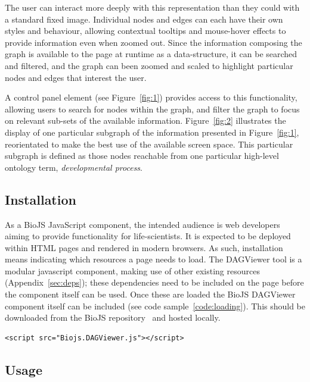 \documentclass[10pt,a4paper,twocolumn]{article}
\begin{document}
The user can interact more deeply with this representation than they could with
a standard fixed image. Individual nodes and edges can each have their own
styles and behaviour, allowing contextual tooltips and mouse-hover effects to
provide information even when zoomed out. Since the information composing the
graph is available to the page at runtime as a data-structure, it can be
searched and filtered, and the graph can been zoomed and scaled to highlight
particular nodes and edges that interest the user.

A control panel element (see Figure~\ref{fig:1}) provides access to this
functionality, allowing users to search for nodes within the graph, and filter
the graph to focus on relevant sub-sets of the available information.
Figure~\ref{fig:2} illustrates the display of one particular subgraph of the
information presented in Figure~\ref{fig:1}, reorientated to make the best use
of the available screen space. This particular subgraph is defined as those
nodes reachable from one particular high-level ontology term,
\emph{developmental process}.

\subsection*{Installation}

As a BioJS JavaScript component, the intended audience is web developers aiming
to provide functionality for life-scientists. It is expected to be deployed
within HTML pages and rendered in modern browsers. As such,
installation means indicating which resources a page needs to load.  The
DAGViewer tool is a modular javascript component, making use of other existing
resources (Appendix~\ref{sec:deps}); these dependencies need to be
included on the page before the component itself can be used.  Once these are
loaded the BioJS DAGViewer component itself can be included (see code
sample~\ref{code:loading}).  This should be downloaded from the BioJS
repository~\cite{site:biojs-registry} and hosted locally.

\begin{lstlisting}[caption={Loading the DAG-Viewer Library}, label={code:loading}]
<script src="Biojs.DAGViewer.js"></script>
\end{lstlisting}

\subsection*{Usage}
\end{document}
